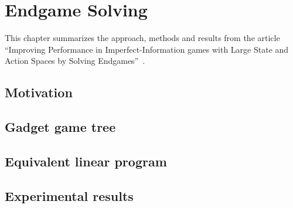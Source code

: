 \chapter{Endgame Solving}

This chapter summarizes the approach, methods and results from the article ``Improving Performance in Imperfect\hyp{}Information games with Large State and Action Spaces by Solving Endgames''~\cite{GanzfriedSandholm13improving}.

\section{Motivation}

\section{Gadget game tree}

\section{Equivalent linear program}

\section{Experimental results}
